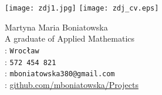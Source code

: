 \documentclass[11pt]{article}
\newcommand*{\myfont}{\fontfamily{qag}\selectfont}
\begin{document}
\thispagestyle{empty} 
\begin{minipage}{0.25\textwidth}
\ifpdf
\texttt{[image: zdj1.jpg]}
\else
\texttt{[image: zdj\_cv.eps]}
\fi
\end{minipage}
\begin{minipage}{0.75\textwidth}
\vskip 15pt
{\color{BrickRed}\huge\myfont Martyna Maria Boniatowska}\\[15pt]
{\color{BrickRed}\large\myfont A graduate of Applied Mathematics}\\[15pt]
 :  \texttt{Wrocław} \\[10pt]
 :  \texttt{572 454 821}\\[10pt]
 : \texttt{mboniatowska380@gmail.com}\\[10pt]
 : \url{github.com/mboniatowska/Projects}
\end{minipage}
\newline
\end{document}
